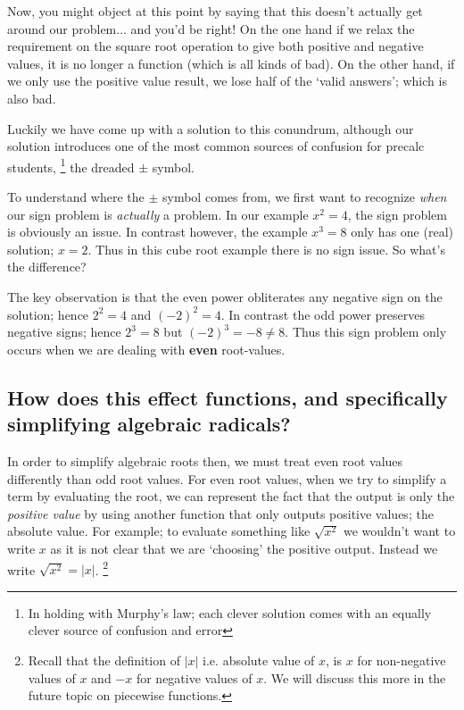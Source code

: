 \documentclass{ximera}
\begin{document}
Now, you might object at this point by saying that this doesn't actually get around our problem... and you'd be right! On the one hand if we relax the requirement on the square root operation to give both positive and negative values, it is no longer a function (which is all kinds of bad). On the other hand, if we only use the positive value result, we lose half of the `valid answers'; which is also bad. 

Luckily we have come up with a solution to this conundrum, although our solution introduces one of the most common sources of confusion for precalc students,%
\footnote{%
    In holding with Murphy's law; each clever solution comes with an equally clever source of confusion and error%
    }%
the dreaded $\pm$ symbol.

To understand where the $\pm$ symbol comes from, we first want to recognize \textit{when} our sign problem is \textit{actually} a problem. In our example $x^2 = 4$, the sign problem is obviously an issue. In contrast however, the example $x^3 = 8$ only has one (real) solution; $x = 2$. Thus in this cube root example there is no sign issue. So what's the difference? 

The key observation is that the even power obliterates any negative sign on the solution; hence $2^2 = 4$ and $(-2)^2 = 4$. In contrast the odd power preserves negative signs; hence $2^3=8$ but $(-2)^3 = -8 \neq 8$. Thus this sign problem only occurs when we are dealing with \textbf{even} root-values.

\subsection*{How does this effect functions, and specifically simplifying algebraic radicals?}

In order to simplify algebraic roots then, we must treat even root values differently than odd root values. For even root values, when we try to simplify a term by evaluating the root, we can represent the fact that the output is only the \textit{positive value} by using another function that only outputs positive values; the absolute value. For example; to evaluate something like $\sqrt{x^2}$ we wouldn't want to write $x$ as it is not clear that we are `choosing' the positive output. Instead we write $\sqrt{x^2} = |x|$.%
\footnote{Recall that the definition of $|x|$ i.e. absolute value of $x$, is $x$ for non-negative values of $x$ and $-x$ for negative values of $x$. We will discuss this more in the future topic on piecewise functions.}
\end{document}
